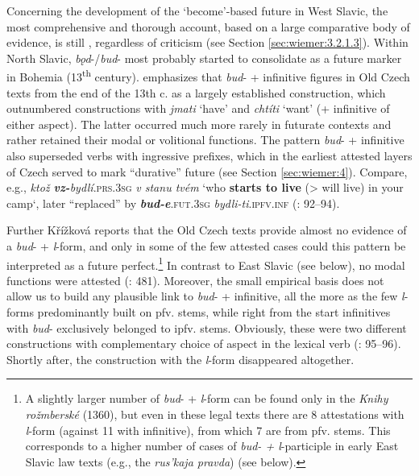 \documentclass[output=paper,colorlinks,citecolor=brown]{langscibook}
\begin{document}
Concerning the development of the `become'-based future in West Slavic, the most comprehensive and thorough account, based on a large comparative body of evidence, is still \citet{Křížková1960}, regardless of criticism (see Section \ref{sec:wiemer:3.2.1.3}). Within North Slavic, \textit{bǫd}-/\textit{bud}- most probably started to consolidate as a future marker in Bohemia (13\textsuperscript{th} century). \citet[92 et passim]{Křížková1960} emphasizes that \textit{bud}- + infinitive figures in Old Czech texts from the end of the 13th c. as a largely established construction, which outnumbered constructions with \textit{jmati} ‘have’ and \textit{chtíti} ‘want’ (+ infinitive of either aspect). The latter occurred much more rarely in futurate contexts and rather retained their modal or volitional functions. The pattern \textit{bud}- + infinitive also superseded verbs with ingressive prefixes, which in the earliest attested layers of Czech served to mark “durative” future (see Section \ref{sec:wiemer:4}). Compare, e.g., \textit{ktož \textbf{vz-}bydlí}.\textsc{prs.3sg}\textit{ v stanu tvém }‘who \textbf{starts to live} (> will live) in your camp‘, later “replaced” by \textbf{\textit{bud-e}}.\textsc{fut.3sg}\textit{ bydli-ti}.\textsc{ipfv.inf} (\cite{Křížková1960}: 92--94). 

Further Křížková reports that the Old Czech texts provide almost no evidence of a \textit{bud}- + \textit{l}-form, and only in some of the few attested cases could this pattern be interpreted as a future perfect.\footnote{A slightly larger number of \textit{bud}- + \textit{l}-form can be found only in the \textit{Knihy rožmberské} (1360), but even in these legal texts there are 8 attestations with \textit{l}-form (against 11 with infinitive), from which 7 are from pfv. stems. This corresponds to a higher number of cases of\textit{ bud- + l}-participle in early East Slavic law texts (e.g., the \textit{rus’kaja pravda}) (see below).} In contrast to East Slavic (see below), no modal functions were attested (\cite{penkova_2016}: 481). Moreover, the small empirical basis does not allow us to build any plausible link to \textit{bud}- + infinitive, all the more as the few \textit{l}-forms predominantly built on pfv. stems, while right from the start infinitives with \textit{bud}- exclusively belonged to ipfv. stems. Obviously, these were two different constructions with complementary choice of aspect in the lexical verb (\citeyear{Křížková1960}: 95--96). Shortly after, the construction with the \textit{l}-form disappeared altogether.
\end{document}
